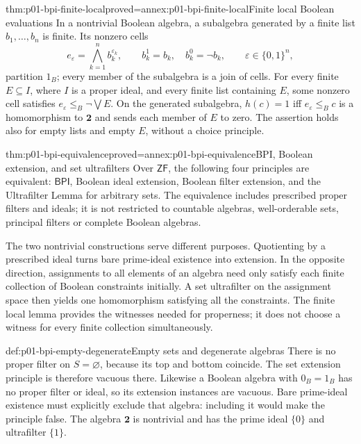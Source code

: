 \begin{hblemma}{thm:p01-bpi-finite-local}{proved=annex:p01-bpi-finite-local}{Finite local Boolean evaluations}
In a nontrivial Boolean algebra, a subalgebra generated by a finite list
\(b_1,\ldots,b_n\) is finite. Its nonzero cells
\[
 e_\varepsilon=\bigwedge_{k=1}^{n}b_k^{\varepsilon_k},
 \qquad b_k^1=b_k,\quad b_k^0=\neg b_k,
 \qquad \varepsilon\in\{0,1\}^{n},
\]
partition \(1_B\); every member of the subalgebra is a join of cells.
For every finite \(E\subseteq I\), where \(I\) is a proper ideal,
and every finite list containing \(E\), some nonzero cell satisfies
\(e_\varepsilon\leq_B\neg\bigvee E\). On the generated subalgebra,
\(h(c)=1\) iff \(e_\varepsilon\leq_B c\) is a homomorphism to
\(\mathbf2\) and sends each member of \(E\) to zero. The assertion
holds also for empty lists and empty \(E\), without a choice principle.
\end{hblemma}

\begin{hbtheorem}{thm:p01-bpi-equivalence}{proved=annex:p01-bpi-equivalence}{BPI, Boolean extension, and set ultrafilters}
Over \(\mathsf{ZF}\), the following four principles are equivalent:
\(\mathsf{BPI}\), Boolean ideal extension, Boolean filter extension,
and the Ultrafilter Lemma for arbitrary sets. The equivalence includes
prescribed proper filters and ideals; it is not restricted to countable
algebras, well-orderable sets, principal filters or complete Boolean algebras.
\end{hbtheorem}

The two nontrivial constructions serve different purposes. Quotienting by
a prescribed ideal turns bare prime-ideal existence into extension. In the
opposite direction, assignments to all elements of an algebra need only
satisfy each finite collection of Boolean constraints initially. A set
ultrafilter on the assignment space then yields one homomorphism satisfying
all the constraints. The finite local lemma provides the witnesses needed
for properness; it does not choose a witness for every finite collection
simultaneously.

\begin{hbwarning}{def:p01-bpi-empty-degenerate}{Empty sets and degenerate algebras}
There is no proper filter on \(S=\varnothing\), because its top and
bottom coincide. The set extension principle is therefore vacuous there.
Likewise a Boolean algebra with \(0_B=1_B\) has no proper filter or
ideal, so its extension instances are vacuous. Bare prime-ideal existence
must explicitly exclude that algebra: including it would make the
principle false. The algebra \(\mathbf2\) is nontrivial and has the
prime ideal \(\{0\}\) and ultrafilter \(\{1\}\).
\end{hbwarning}

